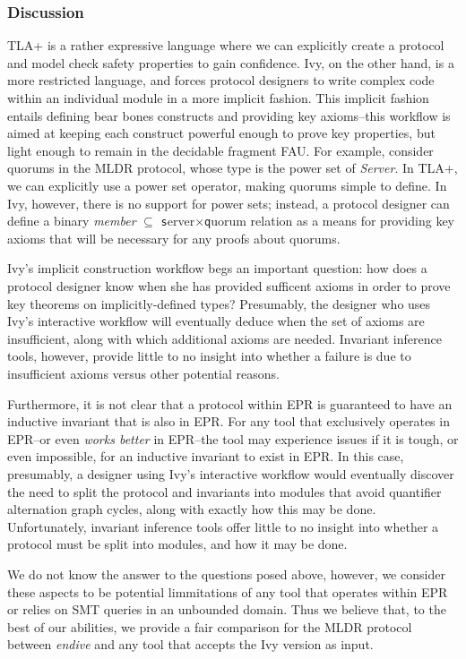 \documentclass[runningheads]{llncs}
\newcommand{\ivy}[1]{{\small\texttt #1}}
\begin{document}
\subsubsection{Discussion}

TLA+ is a rather expressive language where we can explicitly create a protocol and model check safety properties to gain confidence.  Ivy, on the other hand, is a more restricted language, and forces protocol designers to write complex code within an individual module in a more implicit fashion.  This implicit fashion entails defining bear bones constructs and providing key axioms--this workflow is aimed at keeping each construct powerful enough to prove key properties, but light enough to remain in the decidable fragment FAU.  For example, consider quorums in the MLDR protocol, whose type is the power set of \textit{Server}.  In TLA+, we can explicitly use a power set operator, making quorums simple to define.  In Ivy, however, there is no support for power sets; instead, a protocol designer can define a binary \textit{member} ${\scriptstyle\subseteq}$ \ivy{server}$\times$\ivy{quorum} relation as a means for providing key axioms that will be necessary for any proofs about quorums.

Ivy's implicit construction workflow begs an important question: how does a protocol designer know when she has provided sufficent axioms in order to prove key theorems on implicitly-defined types?  Presumably, the designer who uses Ivy's interactive workflow will eventually deduce when the set of axioms are insufficient, along with which additional axioms are needed.  Invariant inference tools, however,  provide little to no insight into whether a failure is due to insufficient axioms versus other potential reasons.

Furthermore, it is not clear that a protocol within EPR is guaranteed to have an inductive invariant that is also in EPR.  For any tool that exclusively operates in EPR--or even \textit{works better} in EPR--the tool may experience issues if it is tough, or even impossible, for an inductive invariant to exist in EPR.  In this case, presumably, a designer using Ivy's interactive workflow would eventually discover the need to split the protocol and invariants into modules that avoid quantifier alternation graph cycles, along with exactly how this may be done.  Unfortunately, invariant inference tools offer little to no insight into whether a protocol must be split into modules, and how it may be done.

We do not know the answer to the questions posed above, however, we consider these aspects to be potential limmitations of any tool that operates within EPR or relies on SMT queries in an unbounded domain.  Thus we believe that, to the best of our abilities, we provide a fair comparison for the MLDR protocol between \textit{endive} and any tool that accepts the Ivy version as input.





\end{document}
